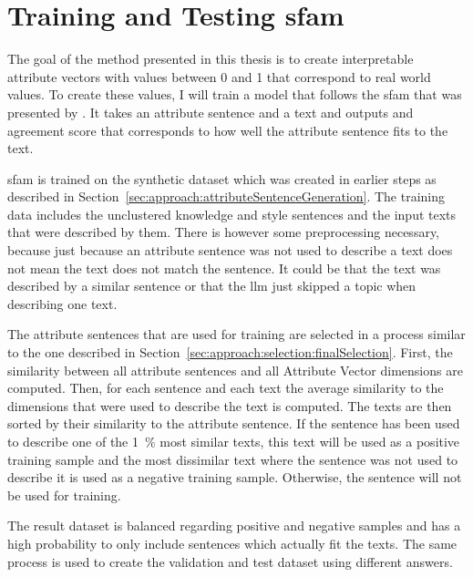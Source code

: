 \section{Training and Testing \acs{sfam}}
\label{sec:approach:sfam}

The goal of the method presented in this thesis is to create interpretable attribute vectors with values between \num{0} and \num{1} that correspond to real world values. To create these values, I will train a model that follows the \acf{sfam} that was presented by \citet{patelLearningInterpretableStyle2023}. It takes an attribute sentence and a text and outputs and agreement score that corresponds to how well the attribute sentence fits to the text.

\ac{sfam} is trained on the synthetic dataset which was created in earlier steps as described in Section~\ref{sec:approach:attributeSentenceGeneration}. The training data includes the unclustered knowledge and style sentences and the input texts that were described by them. There is however some preprocessing necessary, because just because an attribute sentence was not used to describe a text does not mean the text does not match the sentence. It could be that the text was described by a similar sentence or that the \ac{llm} just skipped a topic when describing one text.

The attribute sentences that are used for training are selected in a process similar to the one described in Section~\ref{sec:approach:selection:finalSelection}.
First, the similarity between all attribute sentences and all Attribute Vector dimensions are computed. Then, for each sentence and each text the average similarity to the dimensions that were used to describe the text is computed. The texts are then sorted by their similarity to the attribute sentence. If the sentence has been used to describe one of the \SI{1}{\percent} most similar texts, this text will be used as a positive training sample and the most dissimilar text where the sentence was not used to describe it is used as a negative training sample. Otherwise, the sentence will not be used for training.

The result dataset is balanced regarding positive and negative samples and has a high probability to only include sentences which actually fit the texts. %
The same process is used to create the validation and test dataset using different answers. %

